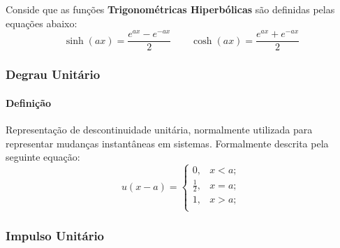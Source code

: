 \documentclass{article}
\begin{document}
            Conside que as funções \textbf{Trigonométricas Hiperbólicas} são definidas pelas equações abaixo:
                \begin{equation}
                    \boxed{
                        \sinh(ax) = \frac{e^{ax} - e^{-ax}}{2}
                    }
                    \qquad
                    \boxed{
                        \cosh(ax) = \frac{e^{ax} + e^{-ax}}{2}
                    }
                \end{equation}

            \subsubsection{Degrau Unitário}
                \paragraph{Definição}Representação de descontinuidade unitária, normalmente utilizada para representar mudanças instantâneas em sistemas. Formalmente descrita pela seguinte equação:
                    \begin{equation}
                        \boxed{
                            u(x - a) = 
                            \begin{cases}
                                0, & x < a;\\
                                \frac{1}{2}, & x = a;\\
                                1, & x > a;\\
                            \end{cases}
                        }
                    \end{equation}

            \subsubsection{Impulso Unitário}
\end{document}
